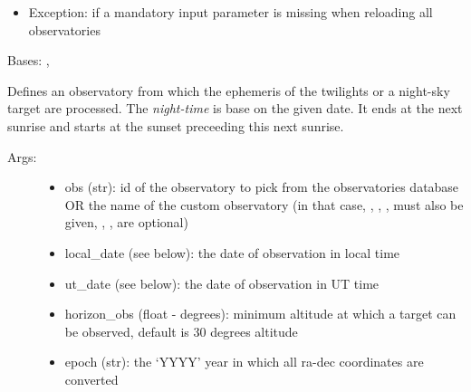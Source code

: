 \documentclass[letterpaper,10pt,english]{sphinxmanual}
\begin{document}
\begin{fulllineitems}
\begin{fulllineitems}
\begin{description}
\begin{itemize}
\item {} 
Exception: if a mandatory input parameter is missing when reloading all observatories

\end{itemize}

\end{description}

\end{fulllineitems}


\end{fulllineitems}


\begin{fulllineitems}
\label{astroobs:astroobs.Observatory}
Bases: , 

Defines an observatory from which the ephemeris of the twilights or a night-sky target are processed. The \emph{night-time} is base on the given date. It ends at the next sunrise and starts at the sunset preceeding this next sunrise.
\begin{description}
\item[{Args:}] \leavevmode\begin{itemize}
\item {} 
obs (str): id of the observatory to pick from the observatories database OR the name of the custom observatory (in that case, , , ,  must also be given, , ,  are optional)

\item {} 
local\_date (see below): the date of observation in local time

\item {} 
ut\_date (see below): the date of observation in UT time

\item {} 
horizon\_obs (float - degrees): minimum altitude at which a target can be observed, default is 30 degrees altitude

\item {} 
epoch (str): the `YYYY' year in which all ra-dec coordinates are converted


\end{itemize}
\end{description}
\end{fulllineitems}
\end{document}
